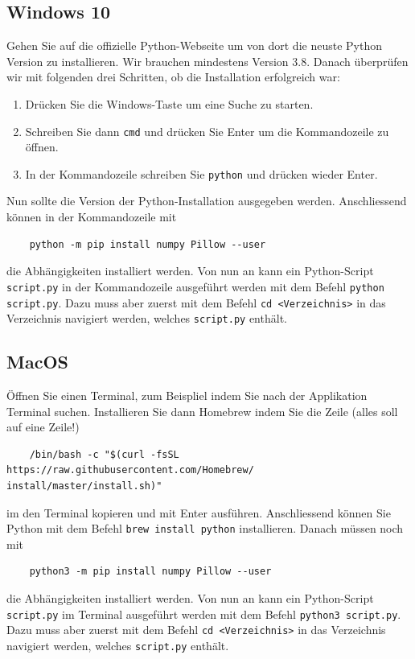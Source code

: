\documentclass[12pt,a4paper]{article}
\theoremstyle{definition}
\theoremstyle{definition}
\begin{document}
\subsection*{Windows 10}
Gehen Sie auf die offizielle Python-Webseite um von dort die neuste Python Version zu installieren. Wir brauchen mindestens Version 3.8.
Danach überprüfen wir mit folgenden drei Schritten, ob die Installation erfolgreich war:
\begin{enumerate}
	\item Drücken Sie die Windows-Taste um eine Suche zu starten.
	\item Schreiben Sie dann \texttt{cmd} und drücken Sie Enter um die Kommandozeile zu öffnen.
	\item In der Kommandozeile schreiben Sie \texttt{python} und drücken wieder Enter.
\end{enumerate}
Nun sollte die Version der Python-Installation ausgegeben werden.
Anschliessend können in der Kommandozeile mit
\begin{verbatim}
	python -m pip install numpy Pillow --user
\end{verbatim}
die Abhängigkeiten installiert werden.
Von nun an kann ein Python-Script \texttt{script.py} in der Kommandozeile ausgeführt werden mit dem Befehl \texttt{python script.py}.
Dazu muss aber zuerst mit dem Befehl \texttt{cd <Verzeichnis>} in das Verzeichnis navigiert werden, welches \texttt{script.py} enthält.

\subsection*{MacOS}
Öffnen Sie einen Terminal, zum Beispliel indem Sie nach der Applikation Terminal suchen.
Installieren Sie dann Homebrew indem Sie die Zeile (alles soll auf eine Zeile!)
\begin{verbatim}
	/bin/bash -c "$(curl -fsSL https://raw.githubusercontent.com/Homebrew/
install/master/install.sh)"
\end{verbatim}
im den Terminal kopieren und mit Enter ausführen.
Anschliessend können Sie Python mit dem Befehl \texttt{brew install python} installieren.
Danach müssen noch mit
\begin{verbatim}
	python3 -m pip install numpy Pillow --user
\end{verbatim}
die Abhängigkeiten installiert werden.
Von nun an kann ein Python-Script \texttt{script.py} im Terminal ausgeführt werden mit dem Befehl \texttt{python3 script.py}.
Dazu muss aber zuerst mit dem Befehl \texttt{cd <Verzeichnis>} in das Verzeichnis navigiert werden, welches \texttt{script.py} enthält.
\end{document}
